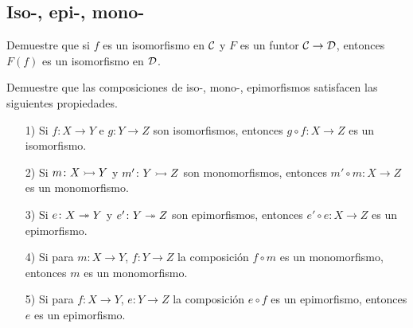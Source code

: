 %
%

\subsection*{Iso-, epi-, mono-}

\begin{ejerc}
  Demuestre que si $f$ es un isomorfismo en $\mathcal{C}$ y $F$ es un funtor
  $\mathcal{C}\to \mathcal{D}$, entonces $F (f)$ es un isomorfismo en
  $\mathcal{D}$.
\end{ejerc}

\begin{ejerc}
  Demuestre que las composiciones de iso-, mono-, epimorfismos satisfacen las
  siguientes propiedades.

  \begin{enumerate}
  \item[1)] Si $f\colon X\to Y$ e $g\colon Y\to Z$ son isomorfismos, entonces
    $g\circ f\colon X\to Z$ es un isomorfismo.

  \item[2)] Si $m\colon X\rightarrowtail Y$ y $m'\colon Y\rightarrowtail Z$ son monomorfismos,
    entonces $m'\circ m\colon X\to Z$ es un monomorfismo.

  \item[3)] Si $e\colon X\twoheadrightarrow Y$ y $e'\colon Y\twoheadrightarrow Z$ son epimorfismos, entonces
    $e'\circ e\colon X\to Z$ es un epimorfismo.

  \item[4)] Si para $m\colon X\to Y$, $f\colon Y\to Z$ la composición $f\circ m$
    es un monomorfismo, entonces $m$ es un monomorfismo.

  \item[5)] Si para $f\colon X\to Y$, $e\colon Y\to Z$ la composición $e\circ f$
    es un epimorfismo, entonces $e$ es un epimorfismo.
  \end{enumerate}
\end{ejerc}

